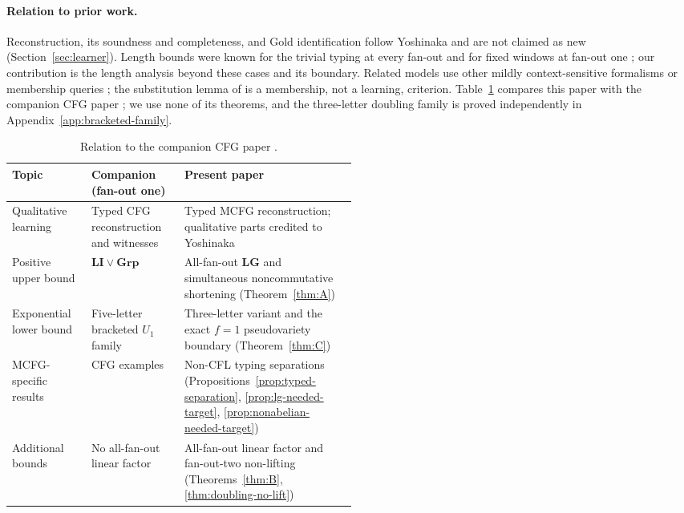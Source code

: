 \documentclass[11pt]{article}
\numberwithin{equation}{section}
\theoremstyle{plain}
\theoremstyle{definition}
\theoremstyle{remark}
\theoremstyle{plain}
\begin{document}
\paragraph{Relation to prior work.}
Reconstruction, its soundness and completeness, and Gold identification
follow Yoshinaka \cite{Yoshinaka2011,Yoshinaka2015General} and are not
claimed as new (Section~\ref{sec:learner}).  Length bounds were known for the
trivial typing at every fan-out \cite{Yoshinaka2011} and for fixed windows at
fan-out one \cite{Yoshinaka2008}; our contribution is the length analysis
beyond these cases and its boundary.  Related models use other mildly
context-sensitive formalisms \cite{OatesEtAl2006} or membership queries
\cite{Yoshinaka2010,ClarkYoshinaka2014,KanazawaYoshinaka2023}; the
substitution lemma of \cite{DuncanEtAl2026Substitution} is a membership, not
a learning, criterion.  Table~\ref{tab:companion-overlap} compares this paper
with the companion CFG paper \cite{kuriyamaCFG}; we use none of its theorems,
and the three-letter doubling family is proved independently in
Appendix~\ref{app:bracketed-family}.

\begin{table}[htbp]
\caption{Relation to the companion CFG paper \cite{kuriyamaCFG}.}
\label{tab:companion-overlap}
\centering\footnotesize
\setlength{\tabcolsep}{3pt}
\begin{tabularx}{\linewidth}{@{}p{0.23\linewidth}p{0.27\linewidth}X@{}}
\hline
Topic & Companion (fan-out one) & Present paper\\
\hline
Qualitative learning
 & Typed CFG reconstruction and witnesses
 & Typed MCFG reconstruction; qualitative parts credited to Yoshinaka\\
Positive upper bound
 & $\mathbf{LI}\vee\mathbf{Grp}$
 & All-fan-out $\mathbf{LG}$ and simultaneous
   noncommutative shortening (Theorem~\ref{thm:A})\\
Exponential lower bound
 & Five-letter bracketed $U_1$ family
 & Three-letter variant and the exact $f=1$
   pseudovariety boundary (Theorem~\ref{thm:C})\\
MCFG-specific results
 & CFG examples
 & Non-CFL typing separations
   (Propositions~\ref{prop:typed-separation},
   \ref{prop:lg-needed-target}, \ref{prop:nonabelian-needed-target})\\
Additional bounds
 & No all-fan-out linear factor
 & All-fan-out linear factor and fan-out-two non-lifting
   (Theorems~\ref{thm:B}, \ref{thm:doubling-no-lift})\\
\hline
\end{tabularx}
\end{table}
\end{document}
